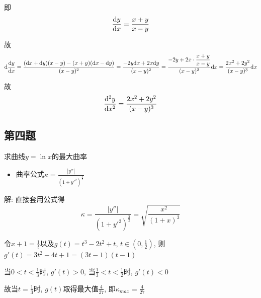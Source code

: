 \documentclass[10pt]{SelfArx} %
\numberwithin{dummy}{section}
\newenvironment{corollary}{\begin{cBox}\noindent{\bf\color{color1} 分析}}{\end{cBox}}
\begin{document}
即
\begin{displaymath}
	\displaystyle\frac{{\rm d}y}{{\rm d}x}=\displaystyle\frac{x+y}{x-y}
\end{displaymath}

故
\begin{displaymath}
{\rm d}\displaystyle\frac{{\rm d}y}{{\rm d}x}=\displaystyle\frac{({\rm d}x+{\rm d}y)(x-y)-(x+y)({\rm d}x-{\rm d}y)}{(x-y)^2}=\displaystyle\frac{-2y{\rm d}x+2x{\rm d}y}{(x-y)^2}=\displaystyle\frac{-2y+2x\cdot\displaystyle\frac{x+y}{x-y}}{(x-y)^2}{\rm d}x=\displaystyle\frac{2x^2+2y^2}{(x-y)^3}{\rm d}x
\end{displaymath}

故
\begin{displaymath}
	\displaystyle\frac{{\rm d}^2 y}{{\rm d} x^2}=\displaystyle\frac{2x^2+2y^2}{(x-y)^3}
\end{displaymath}
\subsection{第四题}
求曲线$y=\ln x$的最大曲率
\begin{corollary}
	\begin{itemize}
		\item 曲率公式$\kappa=\displaystyle\frac{|y''|}{(1+y'^2)^{\displaystyle\frac{3}{2}}}$
	\end{itemize}
\end{corollary}
解: 直接套用公式得
\begin{displaymath}
	\kappa=\displaystyle\frac{|y''|}{(1+y'^2)^{\displaystyle\frac{3}{2}}}=\sqrt{\displaystyle\frac{x^2}{(1+x)^3}}
\end{displaymath}

令$x+1=\displaystyle\frac{1}{t}$以及$g(t)=t^3-2t^2+t$, $t\in (0,\displaystyle\frac{1}{2})$, 则$g'(t)=3t^2-4t+1=(3t-1)(t-1)$

当$0<t<\displaystyle\frac{1}{3}$时, $g'(t)>0$, 当$\displaystyle\frac{1}{3}<t<\displaystyle\frac{1}{2}$时, $g'(t)<0$

故当$t=\displaystyle\frac{1}{3}$时, $g(t)$取得最大值$\displaystyle\frac{4}{27}$, 即$\kappa_{max}=\displaystyle\frac{4}{27}$
\end{document}
